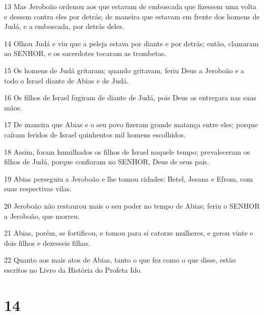 \par 13 Mas Jeroboão ordenou aos que estavam de emboscada que fizessem uma volta e dessem contra eles por detrás; de maneira que estavam em frente dos homens de Judá, e a emboscada, por detrás deles.
\par 14 Olhou Judá e viu que a peleja estava por diante e por detrás; então, clamaram ao SENHOR, e os sacerdotes tocaram as trombetas.
\par 15 Os homens de Judá gritaram; quando gritavam, feriu Deus a Jeroboão e a todo o Israel diante de Abias e de Judá.
\par 16 Os filhos de Israel fugiram de diante de Judá, pois Deus os entregara nas suas mãos.
\par 17 De maneira que Abias e o seu povo fizeram grande matança entre eles; porque caíram feridos de Israel quinhentos mil homens escolhidos.
\par 18 Assim, foram humilhados os filhos de Israel naquele tempo; prevaleceram os filhos de Judá, porque confiaram no SENHOR, Deus de seus pais.
\par 19 Abias perseguiu a Jeroboão e lhe tomou cidades: Betel, Jesana e Efrom, com suas respectivas vilas.
\par 20 Jeroboão não restaurou mais o seu poder no tempo de Abias; feriu o SENHOR a Jeroboão, que morreu.
\par 21 Abias, porém, se fortificou, e tomou para si catorze mulheres, e gerou vinte e dois filhos e dezesseis filhas.
\par 22 Quanto aos mais atos de Abias, tanto o que fez como o que disse, estão escritos no Livro da História do Profeta Ido.

\chapter{14}

